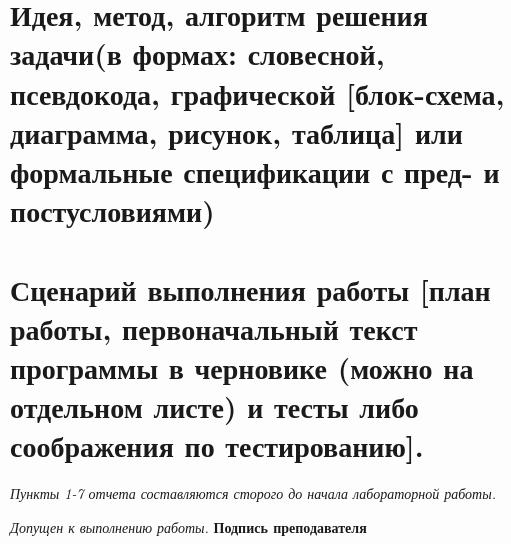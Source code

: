 \section{Идея, метод, алгоритм \textnormal{\small решения задачи(в формах: словесной, псевдокода, графической [блок-схема, диаграмма, рисунок,
     \singlespace таблица] или формальные спецификации с пред- и постусловиями)}}

\vspace{0.4\textheight}

\section{Сценарий выполнения работы \textnormal{\small [план работы, первоначальный текст программы в черновике (можно на отдельном листе) и
     \singlespace тесты либо соображения по тестированию].}}

\vspace{0.45\textheight}

\textit{Пункты 1-7 отчета составляются сторого до начала лабораторной работы.}

\begin{flushright}
  \textit{Допущен к выполнению работы.} \textbf{Подпись преподавателя} \uline{\hspace{3cm}}
\end{flushright}

\newpage
